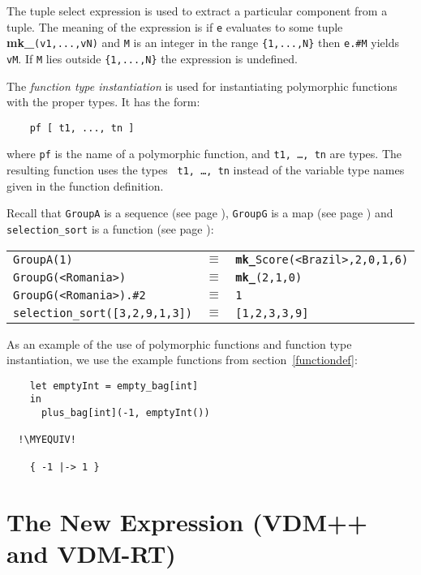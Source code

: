 \documentclass{overturerepchap}
\newcommand{\MYEQUIV}{$\equiv$}
\newcommand{\keyw}[1]{{\bf\ttfamily #1}}
\begin{document}
{\begin{description}
  The tuple select expression is used to extract a particular
  component from a tuple. The meaning of the expression is if
  \texttt{e} evaluates to some tuple
  \keyw{mk\_}\texttt{(v1,...,vN)} and \texttt{M} is an integer in the
  range \verb+{1,...,N}+ then \texttt{e.\#M} yields \texttt{vM}. If
  \texttt{M} lies outside \verb+{1,...,N}+ the expression is undefined.

  The {\it function type instantiation\/} is used for instantiating
  polymorphic functions with the proper types. It has the form:
  \begin{lstlisting}
    pf [ t1, ..., tn ]
  \end{lstlisting}
  where {\tt pf} is the name of a polymorphic function, and {\tt t1,
    \ldots, tn} are types. The resulting function uses the types {\tt
    t1, \ldots, tn} instead of the variable type names given in the
  function definition.

\item[Examples:] Recall that \texttt{GroupA} is a sequence (see page
  \pageref{GroupAdef}), \texttt{GroupG} is a map (see page \pageref{GroupGdef})
  and \texttt{selection\_sort} is a function (see page \pageref{selectionSortdef}):

  \begin{tabular}{lcl}
  \texttt{GroupA(1)} & $\equiv$ &
                           \texttt{\keyw{mk\_}Score(<Brazil>,2,0,1,6)}\\
  \texttt{GroupG(<Romania>)} & $\equiv$ &
                           \texttt{\keyw{mk\_}(2,1,0)}\\
  \texttt{GroupG(<Romania>).\#2} & $\equiv$ &
                           \texttt{1}\\
  \texttt{selection\_sort([3,2,9,1,3])} & $\equiv$ &
                           \texttt{[1,2,3,3,9]}
  \end{tabular}

  As an example of the use of polymorphic functions and function type
  instantiation, we use the example functions from
  section~\ref{functiondef}:
  \begin{lstlisting}
    let emptyInt = empty_bag[int]
    in
      plus_bag[int](-1, emptyInt())

  !\MYEQUIV!

    { -1 |-> 1 }
  \end{lstlisting}

\end{description}

\section{The New Expression (VDM++ and VDM-RT)}
\label{sec:creation}

}
\end{document}
